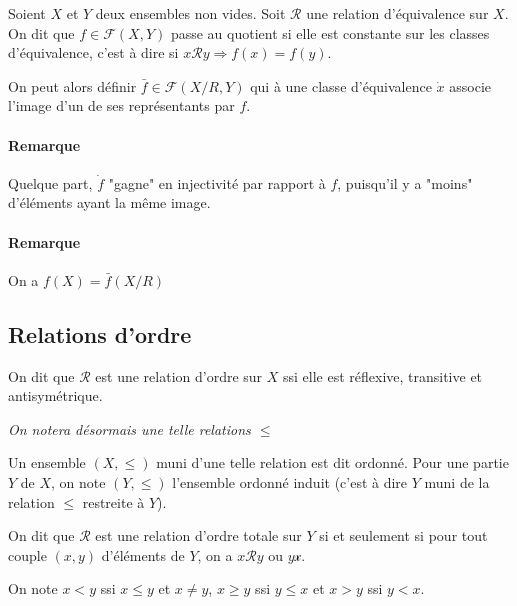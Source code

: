 \documentclass{scrartcl}
\begin{document}
			Soient $X$ et $Y$ deux ensembles non vides. Soit $\mathcal{R}$ une relation d'équivalence sur $X$.
			On dit que $f\in\mathcal{F}(X,Y)$ passe au quotient si elle est constante sur les classes d'équivalence,
			c'est à dire si $x\mathcal{R}y \Rightarrow f(x)=f(y)$.

			On peut alors définir $\bar{f}\in\mathcal{F}(X/R,Y)$ qui à une classe d'équivalence $\dot{x}$ associe
			l'image d'un de ses représentants par $f$.

			\paragraph{Remarque} Quelque part, $\dot{f}$ "gagne" en injectivité par rapport à $f$, puisqu'il y a "moins" d'éléments
			ayant la même image.
			\paragraph{Remarque} On a $f(X) = \bar{f}(X/R)$
		
		\subsection{Relations d'ordre}
			On dit que $\mathcal{R}$ est une relation d'ordre sur $X$ ssi elle est réflexive, transitive et antisymétrique.
			\begin{center}\textit{On notera désormais une telle relations $\leq$}\end{center}
			Un ensemble $(X,\leq)$ muni d'une telle relation est dit ordonné. Pour une partie $Y$ de $X$,
			on note $(Y,\leq)$ l'ensemble ordonné induit (c'est à dire $Y$ muni de la relation $\leq$ restreite à $Y$).

			On dit que $\mathcal{R}$ est une relation d'ordre totale sur $Y$ si et seulement si pour tout couple
			$(x,y)$ d'éléments de $Y$, on a $x\mathcal{R}y$ ou $y\mathcal{x}$.

			On note $x < y$ ssi $x \leq y$ et $x \neq y$, $x \geq y$ ssi $y \leq x$ et $x > y$ ssi $y < x$.
\end{document}
